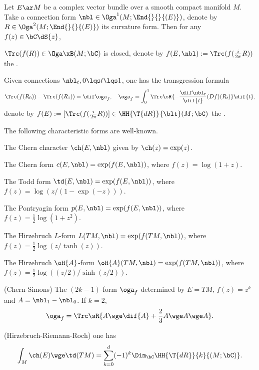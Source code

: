 \documentclass[article, a4paper, twoside]{universal}
\begin{document}
\confighead{}{}{}



\begin{thm}
	Let $E\ar M$ be a complex vector bundle over a smooth compact manifold $M$. Take a connection form $\nbl\in\Oga^{1}(M;\End{}{}{(E)})$, denote by $R\in\Oga^{2}(M;\End{}{}{(E)})$ its curvature form. Then for any $f(z)\in\bC\dS{z}$,
	\begin{itm}
		\item $\Trc(f(R))\in\Oga\xB(M;\bC)$ is closed, denote by $f(E,\nbl):=\Trc(f(\frac{i}{2\pi}R))$ the .
		\item Given connections $\nbl_{t},0\lqs t\lqs 1$, one has the transgression formula
		\[
			\Trc(f(R_{0}))-\Trc(f(R_{1}))=\dif\oga_{f},\quad \oga_{f}=\int_{0}^{1}\Trc\sR{-\frac{\dif\nbl_{t}}{\dif{t}}(Df)(R_{t})}\dif{t},
		\]
        denote by $f(E):=[\Trc(f(\frac{i}{2\pi}R))]\in\HH{\T{dR}}{\blt}(M;\bC)$ the .
	\end{itm}
\end{thm}

\begin{exg}
    The following characteristic forms are well-known.
    \begin{itm}
        \item The Chern character $\ch(E,\nbl)$ given by $\ch(z)=\exp(z)$.
        \item The Chern form $c(E,\nbl)=\exp(f(E,\nbl))$, where $f(z)=\log(1+z)$.
        \item The Todd form $\td(E,\nbl)=\exp(f(E,\nbl))$, where $f(z)=\log(z/(1-\exp(-z)))$.
        \item The Pontryagin form $p(E,\nbl)=\exp(f(E,\nbl))$, where $f(z)=\frac{1}{2}\log(1+z^{2})$.
        \item The Hirzebruch $L$-form $L(TM,\nbl)=\exp(f(TM,\nbl))$, where $f(z)=\frac{1}{2}\log{(z/\tanh(z))}$.
        \item The Hirzebruch $\oH{A}$-form $\oH{A}(TM,\nbl)=\exp(f(TM,\nbl))$, where $f(z)=\frac{1}{2}\log{((z/2)/\sinh(z/2))}$.
        \item (Chern-Simons) The $(2k-1)$-form $\oga_{f}$ determined by $E=TM$, $f(z)=z^{k}$ and $A=\nbl_{1}-\nbl_{0}$. If $k=2$,
        \[
            \oga_{f}=\Trc\sR{A\wge\dif{A}+\frac{2}{3}A\wge A\wge A}.
        \]
        \item (Hirzebruch-Riemann-Roch) one has
        \[
            \int_{M}\ch(E)\wge\td(TM)=\sum_{k=0}^{d}(-1)^{k}\Dim_{\bC}\HH{\T{dR}}{k}{(M;\bC)}.
        \]
    \end{itm}
\end{exg}








\printref
\end{document}
